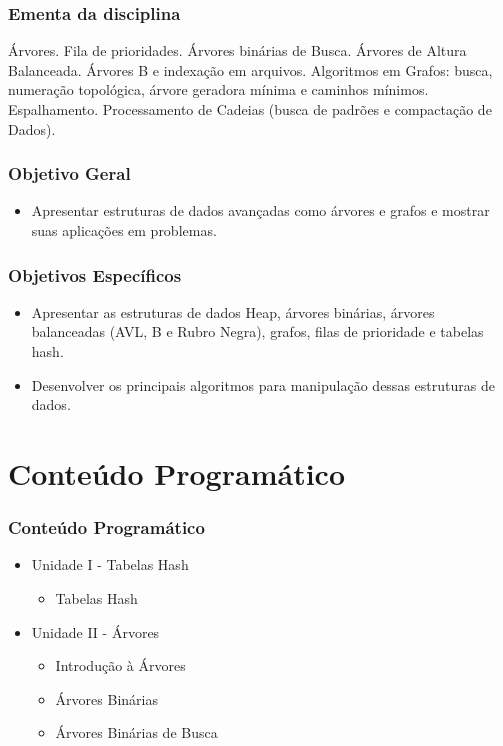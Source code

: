 \documentclass[aspectratio=169]{beamer}
\begin{document}
\begin{frame}
\frametitle{Ementa da disciplina}
Árvores. Fila de prioridades. Árvores binárias de Busca. Árvores de Altura Balanceada. Árvores B e indexação em arquivos. Algoritmos em Grafos: busca, numeração topológica, árvore geradora mínima e caminhos mínimos. Espalhamento. Processamento de Cadeias (busca de padrões e compactação de Dados).
\end{frame}


\begin{frame}
\frametitle{Objetivo Geral}
\begin{itemize}
 \item Apresentar estruturas de dados avançadas como árvores e grafos e mostrar suas aplicações em problemas.
\end{itemize}
\end{frame}


\begin{frame}
\frametitle{Objetivos Específicos}
\begin{itemize}
 \item Apresentar as estruturas de dados Heap, árvores binárias, árvores balanceadas (AVL, B e Rubro Negra), grafos, filas de prioridade e tabelas hash.
 \item Desenvolver os principais algoritmos para manipulação dessas estruturas de dados.
\end{itemize}  
\end{frame}

\section{Conteúdo Programático}

\begin{frame}
\frametitle{Conteúdo Programático}
\begin{itemize}
  \item Unidade I - Tabelas Hash
  \begin{itemize}
  \item Tabelas Hash  
  \end{itemize}
   \item Unidade II - Árvores
  \begin{itemize}
  \item Introdução à Árvores
  \item Árvores Binárias
  \item Árvores Binárias de Busca   
  \end{itemize}
\end{itemize}
 \end{frame}
\end{document}
